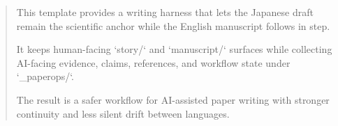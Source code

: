 \begin{abstract}
This template provides a writing harness that lets the Japanese draft remain the scientific anchor while the English manuscript follows in step.

It keeps human-facing `story/` and `manuscript/` surfaces while collecting AI-facing evidence, claims, references, and workflow state under `_paperops/`.

The result is a safer workflow for AI-assisted paper writing with stronger continuity and less silent drift between languages.
\end{abstract}

